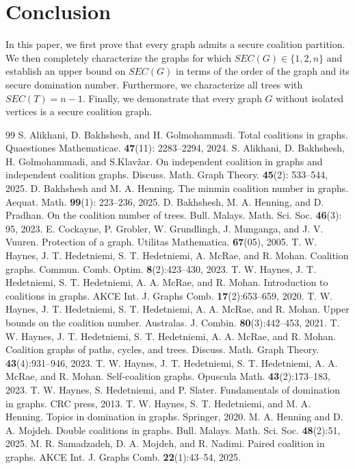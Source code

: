 \documentclass[12pt]{article}
\begin{document}
    \section*{Conclusion}
    In this paper, we first prove that every graph admits a secure coalition partition. We then completely characterize the graphs for which $SEC(G) \in \{1,2,n\}$ and establish an upper bound on $SEC(G)$ in terms of the order of the graph and its secure domination number. Furthermore, we characterize all trees with $SEC(T) = n-1$. Finally, we demonstrate that every graph $G$ without isolated vertices is a secure coalition graph.
 \begin{thebibliography}{99}
 S. Alikhani, D. Bakhshesh, and H. Golmohammadi. Total coalitions in graphs. Quaestiones Mathematicae. \textbf{47}(11): 2283--2294, 2024.
 S. Alikhani, D. Bakhshesh, H. Golmohammadi, and S.Klav{\v{z}}ar. On independent coalition in graphs and independent coalition graphs. Discuss. Math. Graph Theory. \textbf{45}(2): 533–544, 2025.
 D. Bakhshesh and M. A. Henning. The minmin coalition number in graphs. Aequat. Math. \textbf{99}(1): 223–236, 2025.
 D. Bakhshesh, M. A. Henning, and D. Pradhan. On the coalition number of trees. Bull. Malays. Math. Sci. Soc. \textbf{46}(3): 95, 2023.
 E. Cockayne, P. Grobler, W. Grundlingh, J. Munganga, and J. V. Vuuren. Protection of a graph. Utilitas Mathematica. \textbf{67}(05), 2005.
 T. W. Haynes, J. T. Hedetniemi, S. T. Hedetniemi, A. McRae, and R. Mohan. Coalition graphs. Commun. Comb. Optim. \textbf{8}(2):423–430, 2023.
 T. W. Haynes, J. T. Hedetniemi, S. T. Hedetniemi, A. A. McRae, and R. Mohan. Introduction to coalitions in graphs. AKCE Int. J. Graphs Comb. \textbf{17}(2):653–659, 2020.
 T. W. Haynes, J. T. Hedetniemi, S. T. Hedetniemi, A. A. McRae, and R. Mohan. Upper bounds on the coalition number. Australas. J. Combin. \textbf{80}(3):442–453, 2021.
 T. W. Haynes, J. T. Hedetniemi, S. T. Hedetniemi, A. A. McRae, and R. Mohan. Coalition graphs of paths, cycles, and trees. Discuss. Math. Graph Theory. \textbf{43}(4):931–946, 2023.
T. W. Haynes, J. T. Hedetniemi, S. T. Hedetniemi, A. A. McRae, and R. Mohan. Self-coalition graphs. Opuscula Math. \textbf{43}(2):173–183, 2023.
T. W. Haynes, S. Hedetniemi, and P. Slater. Fundamentals of domination in graphs. CRC press, 2013.
 T. W. Haynes, S. T. Hedetniemi, and M. A. Henning. Topics in domination in graphs. Springer, 2020.
M. A. Henning and D. A. Mojdeh. Double coalitions in graphs. Bull. Malays. Math. Sci. Soc. \textbf{48}(2):51, 2025.
M. R. Samadzadeh, D. A. Mojdeh, and R. Nadimi. Paired coalition in graphs. AKCE Int. J. Graphs
Comb. \textbf{22}(1):43–54, 2025.
\end{thebibliography}
    
\end{document}
